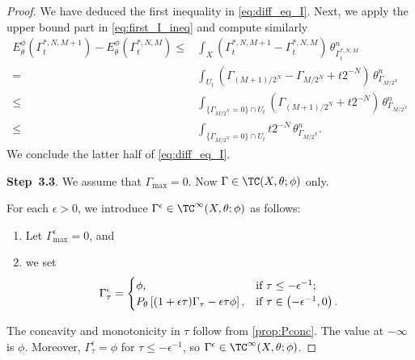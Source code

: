 \begin{proof}
     We have deduced the first inequality in \eqref{eq:diff_eq_I}. Next, we apply the upper bound part in \eqref{eq:first_I_ineq} and compute similarly
     \[
     \begin{aligned}
     E_{\theta}^{\phi}(\Gamma_t^{*,N,M+1})-E_{\theta}^{\phi}(\Gamma_t^{*,N,M})\leq & \int_X \left(\Gamma_t^{*,N,M+1}-\Gamma_t^{*,N,M}\right)\,\theta^n_{\Gamma_t^{*,N,M}}\\
     =& \int_{U_t} \left(\Gamma_{(M+1)/2^N}-\Gamma_{M/2^N}+t2^{-N}\right)\,\theta^n_{\Gamma_{M/2^N}}\\
     \leq & \int_{\{\Gamma_{M/2^N}=0\}\cap U_t}\left(\Gamma_{(M+1)/2^N}+t2^{-N}\right)\,\theta^n_{\Gamma_{M/2^N}} \\
     \leq &\int_{\{\Gamma_{M/2^N}=0\}\cap U_t} t2^{-N}\,\theta^n_{\Gamma_{M/2^N}}.
     \end{aligned}
     \]
     We conclude the latter half of \eqref{eq:diff_eq_I}.

    \textbf{Step~3.3}. We assume that $\Gamma_{\max}=0$. Now $\Gamma\in \TC(X,\theta;\phi)$ only.

    For each $\epsilon>0$, we introduce $\Gamma^{\epsilon}\in \TC^{\infty}(X,\theta;\phi)$ as follows:
    \begin{enumerate}
        \item\label{itm:chapter-testcurve:L718:1} Let $\Gamma^{\epsilon}_{\max}=0$, and
        \item\label{itm:chapter-testcurve:L718:2} we set
        \[
        \Gamma^{\epsilon}_{\tau}=
        \begin{cases}
            \phi,&\textup{if }\tau\leq -\epsilon^{-1};\\
            P_{\theta}\left[ (1+\epsilon\tau)\Gamma_{\tau}-\epsilon\tau \phi \right],&\textup{if }\tau\in \left(-\epsilon^{-1},0\right).
        \end{cases}
        \]
    \end{enumerate}
    The concavity and monotonicity in $\tau$ follow from \cref{prop:Pconc}. The value at $-\infty$ is $\phi$. Moreover, $\Gamma^\epsilon_\tau=\phi$ for $\tau\leq-\epsilon^{-1}$, so $\Gamma^\epsilon\in\TC^\infty(X,\theta;\phi)$.


\end{proof}
